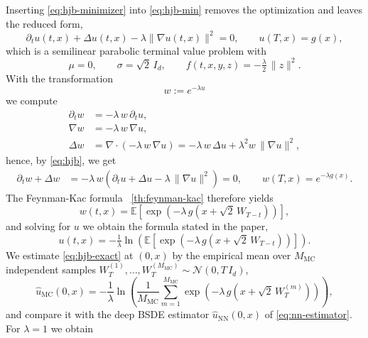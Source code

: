 ﻿\documentclass[10pt,a4paper]{article}
\begin{document}
Inserting \eqref{eq:hjb-minimizer} into \eqref{eq:hjb-min} removes the optimization and leaves the reduced form,
\begin{equation}
\partial_t u(t,x) + \Delta u(t,x)
- \lambda \lVert \nabla u(t,x) \rVert^2 = 0,
\qquad
u(T,x) = g(x),
\label{eq:hjb}
\end{equation}
which is a semilinear parabolic terminal value problem with
\begin{equation*}
\mu = 0,
\qquad
\sigma = \sqrt2\,I_d,
\qquad
f(t,x,y,z) = -\tfrac{\lambda}{2}\,\lVert z\rVert^2 .
\end{equation*}
With the transformation
\begin{equation}
w := e^{-\lambda u}
\end{equation}
we compute
\begin{align}
\partial_t w &= -\lambda\, w\,\partial_t u,
\nonumber\\
\nabla w &= -\lambda\, w\,\nabla u,
\nonumber\\
\Delta w &= \nabla\cdot\left(-\lambda\, w\,\nabla u\right)
= -\lambda\, w\,\Delta u + \lambda^2 w\,\lVert\nabla u\rVert^2,
\end{align}
hence, by \eqref{eq:hjb}, we get
\begin{align}
\partial_t w + \Delta w
&= -\lambda\, w
\left(\partial_t u + \Delta u - \lambda\,\lVert\nabla u\rVert^2\right)
= 0,
\qquad
w(T,x) = e^{-\lambda g(x)}.
\end{align}
The Feynman-Kac formula ~\ref{th:feynman-kac} therefore yields
\begin{equation}
w(t,x)
= \mathbb E\!\left[\exp\!\left(-\lambda\,
g\!\left(x+\sqrt2\,W_{T-t}\right)\right)\right],
\end{equation}
and solving for $u$ we obtain the formula stated in the paper,
\begin{equation}
u(t,x) = -\tfrac{1}{\lambda}
\ln\!\left(\mathbb E\!\left[\exp\!\left(-\lambda\,
g\!\left(x+\sqrt2\,W_{T-t}\right)\right)\right]\right).
\label{eq:hjb-exact}
\end{equation}
We estimate \eqref{eq:hjb-exact} at $(0,x)$ by the empirical mean over $M_{\mathrm{MC}}$ independent samples $W_T^{(1)},\dots,W_T^{(M_{\mathrm{MC}})} \sim \mathcal N(0,T\,I_d)$,
\begin{equation*}
\hat u_{\mathrm{MC}}(0,x)
= -\frac{1}{\lambda}
\ln\!\left(\frac{1}{M_{\mathrm{MC}}}
\sum_{m=1}^{M_{\mathrm{MC}}}
\exp\!\left(-\lambda\,
g\!\left(x+\sqrt2\,W_T^{(m)}\right)\right)\right),
\end{equation*}
and compare it with the deep BSDE estimator $\hat u_{\mathrm{NN}}(0,x)$ of \eqref{eq:nn-estimator}. For $\lambda=1$ we obtain
\end{document}
